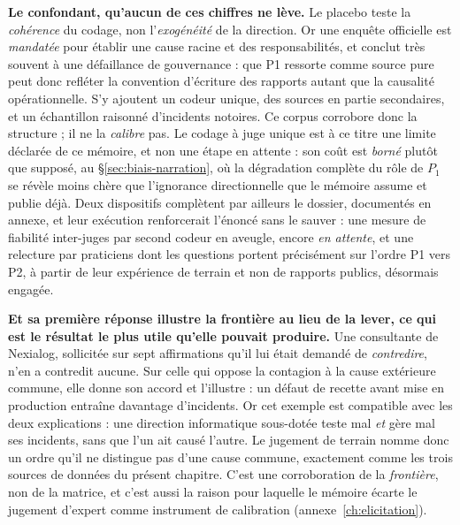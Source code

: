 \begin{attention}
\textbf{Le confondant, qu'aucun de ces chiffres ne lève.} Le placebo teste la \emph{cohérence}
du codage, non l'\emph{exogénéité} de la direction. Or une enquête officielle est \emph{mandatée}
pour établir une cause racine et des responsabilités, et conclut très souvent à une
\og{}défaillance de gouvernance\fg{} : que P1 ressorte comme source pure peut donc refléter la
convention d'écriture des rapports autant que la causalité opérationnelle. S'y ajoutent
un codeur unique, des sources en partie secondaires, et un échantillon raisonné d'incidents
notoires. Ce corpus corrobore donc la structure ; il ne la \emph{calibre} pas. Le
codage à juge unique est à ce titre une limite déclarée de ce mémoire, et non une étape
en attente : son coût est \emph{borné} plutôt que supposé, au \S\ref{sec:biais-narration}, où la
dégradation complète du rôle de $P_1$ se révèle moins chère que l'ignorance directionnelle que
le mémoire assume et publie déjà. Deux dispositifs complètent par ailleurs le dossier, documentés en annexe, et leur exécution
renforcerait l'énoncé sans le sauver : une mesure de fiabilité inter-juges par second
codeur en aveugle, encore \emph{en attente}, et une relecture par praticiens dont les
questions portent précisément sur l'ordre P1 vers P2, à partir de leur expérience de terrain et
non de rapports publics, désormais engagée.

\textbf{Et sa première réponse illustre la frontière au lieu de la lever, ce qui est le
résultat le plus utile qu'elle pouvait produire.} Une consultante de Nexialog, sollicitée sur
sept affirmations qu'il lui était demandé de \emph{contredire}, n'en a contredit aucune. Sur
celle qui oppose la contagion à la cause extérieure commune, elle donne son accord et
l'illustre : un défaut de recette avant mise en production entraîne davantage d'incidents. Or
cet exemple est compatible avec les deux explications : une direction informatique
sous-dotée teste mal \emph{et} gère mal ses incidents, sans que l'un ait causé l'autre. Le
jugement de terrain nomme donc un ordre qu'il ne distingue pas d'une cause commune, exactement
comme les trois sources de données du présent chapitre. C'est une corroboration de la
\emph{frontière}, non de la matrice, et c'est aussi la raison pour laquelle le mémoire écarte
le jugement d'expert comme instrument de calibration (annexe~\ref{ch:elicitation}).
\end{attention}

